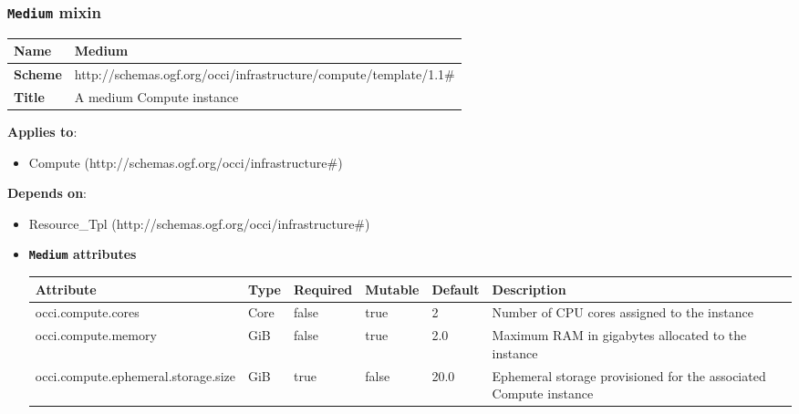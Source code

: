 \subsubsection{\texttt{Medium} mixin}
\begin{center}
\begin{tabular}{|l|l|}
  \hline
  \textbf{Name} & Medium \\
  \hline  
  \textbf{Scheme} & http://schemas.ogf.org/occi/infrastructure/compute/template/1.1\# \\
  \hline
  \textbf{Title} & A medium Compute instance \\
  \hline
\end{tabular}
\end{center}
\textbf{Applies to}:
\begin{itemize}
	\item Compute (http://schemas.ogf.org/occi/infrastructure\#)
\end{itemize}
\textbf{Depends on}:
\begin{itemize}
	\item Resource\_Tpl (http://schemas.ogf.org/occi/infrastructure\#)
\end{itemize}

\begin{itemize}
\item \textbf{\texttt{Medium} attributes}

\begin{tabularx}{\textwidth}{|l|l|p{1.4cm}|p{1.3cm}|l|X|}
  \hline
  \textbf{Attribute} & \textbf{Type} & \textbf{Required} & \textbf{Mutable} & \textbf{Default} & \textbf{Description} \\
  \hline  
  occi.compute.cores & Core & false & true & 2 & Number of CPU cores assigned to the instance \\
  \hline
  occi.compute.memory & GiB & false & true & 2.0 & Maximum RAM in gigabytes allocated to the instance \\
  \hline
  occi.compute.ephemeral.storage.size & GiB & true & false & 20.0 & Ephemeral storage provisioned for the associated Compute instance \\
  \hline
\end{tabularx}
\end{itemize}


